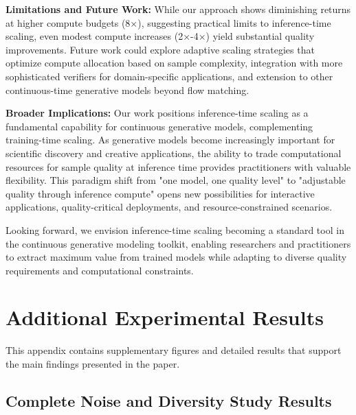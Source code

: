 \documentclass{article}
\begin{document}
\textbf{Limitations and Future Work:} While our approach shows diminishing returns at higher compute budgets (8×), suggesting practical limits to inference-time scaling, even modest compute increases (2×-4×) yield substantial quality improvements. Future work could explore adaptive scaling strategies that optimize compute allocation based on sample complexity, integration with more sophisticated verifiers for domain-specific applications, and extension to other continuous-time generative models beyond flow matching.

\textbf{Broader Implications:} Our work positions inference-time scaling as a fundamental capability for continuous generative models, complementing training-time scaling. As generative models become increasingly important for scientific discovery and creative applications, the ability to trade computational resources for sample quality at inference time provides practitioners with valuable flexibility. This paradigm shift from "one model, one quality level" to "adjustable quality through inference compute" opens new possibilities for interactive applications, quality-critical deployments, and resource-constrained scenarios.

Looking forward, we envision inference-time scaling becoming a standard tool in the continuous generative modeling toolkit, enabling researchers and practitioners to extract maximum value from trained models while adapting to diverse quality requirements and computational constraints.





\appendix

\section{Additional Experimental Results}

This appendix contains supplementary figures and detailed results that support the main findings presented in the paper.

\subsection{Complete Noise and Diversity Study Results}
\end{document}
